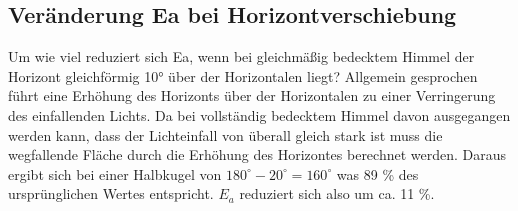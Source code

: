 \subsection{Veränderung Ea bei Horizontverschiebung}
Um wie viel reduziert sich Ea, wenn bei gleichmäßig bedecktem Himmel der Horizont
gleichförmig 10° über der Horizontalen liegt?
Allgemein gesprochen führt eine Erhöhung des Horizonts über der Horizontalen zu einer Verringerung des einfallenden Lichts.
Da bei vollständig bedecktem Himmel davon ausgegangen werden kann, dass der Lichteinfall von überall gleich stark ist muss die wegfallende Fläche durch die Erhöhung des Horizontes berechnet werden. Daraus ergibt sich bei einer Halbkugel von $180^{\circ}-20^{\circ}=160^{\circ}$ was 89 \% des ursprünglichen Wertes entspricht. $E_a$ reduziert sich also um ca. 11 \%. 




